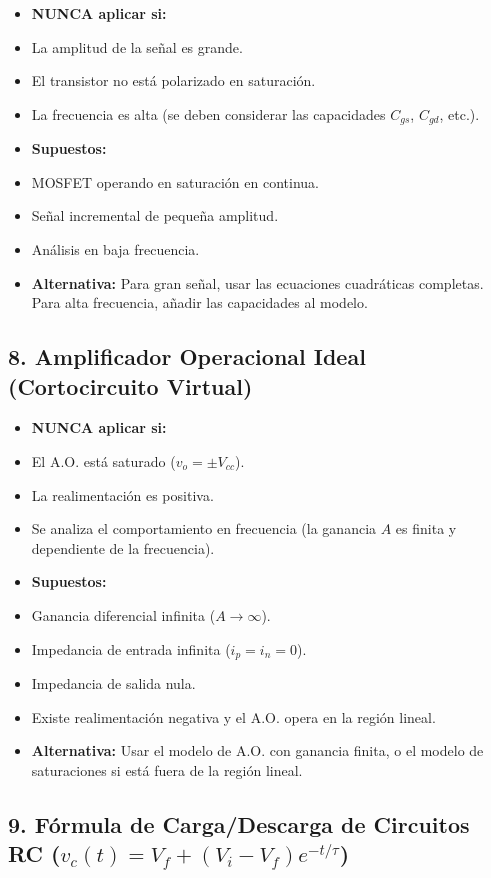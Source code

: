 \documentclass[11pt,a4paper]{article}
\begin{document}
\begin{itemize}[leftmargin=*,topsep=2pt,itemsep=1pt]
  \item \textbf{NUNCA aplicar si:}
  \item La amplitud de la señal es grande.
  \item El transistor no está polarizado en saturación.
  \item La frecuencia es alta (se deben considerar las capacidades $C_{gs}$, $C_{gd}$, etc.).
  \item \textbf{Supuestos:}
  \item MOSFET operando en saturación en continua.
  \item Señal incremental de pequeña amplitud.
  \item Análisis en baja frecuencia.
  \item \textbf{Alternativa:} Para gran señal, usar las ecuaciones cuadráticas completas. Para alta frecuencia, añadir las capacidades al modelo.
\end{itemize}


\subsection*{8. Amplificador Operacional Ideal (Cortocircuito Virtual)}


\begin{itemize}[leftmargin=*,topsep=2pt,itemsep=1pt]
  \item \textbf{NUNCA aplicar si:}
  \item El A.O. está saturado ($v_o = \pm V_{cc}$).
  \item La realimentación es positiva.
  \item Se analiza el comportamiento en frecuencia (la ganancia $A$ es finita y dependiente de la frecuencia).
  \item \textbf{Supuestos:}
  \item Ganancia diferencial infinita ($A \to \infty$).
  \item Impedancia de entrada infinita ($i_p = i_n = 0$).
  \item Impedancia de salida nula.
  \item Existe realimentación negativa y el A.O. opera en la región lineal.
  \item \textbf{Alternativa:} Usar el modelo de A.O. con ganancia finita, o el modelo de saturaciones si está fuera de la región lineal.
\end{itemize}


\subsection*{9. Fórmula de Carga/Descarga de Circuitos RC ($v_c(t) = V_f + (V_i - V_f)e^{-t/\tau}$)}
\end{document}
